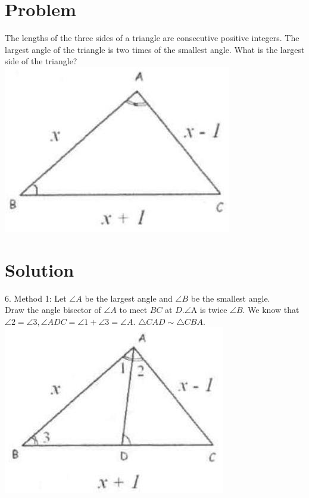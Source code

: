\documentclass{article}
\begin{document}
\section*{Problem}
The lengths of the three sides of a triangle are consecutive positive integers. The largest angle of the triangle is two times of the smallest angle. What is the largest side of the triangle?\\
\centering
\includegraphics[width=\textwidth]{images/066(3).jpg}

\section*{Solution}
6.
Method 1: Let \(\angle A\) be the largest angle and \(\angle B\) be the smallest angle.\\
Draw the angle bisector of \(\angle A\) to meet \(B C\) at \(D . \angle \mathrm{A}\) is twice \(\angle B\). We know that \(\angle 2=\angle 3, \angle A D C=\angle 1+\angle 3=\angle A\). \(\triangle C A D \sim \triangle C B A\).\\
\centering
\includegraphics[width=\textwidth]{images/072(1).jpg}
\end{document}
